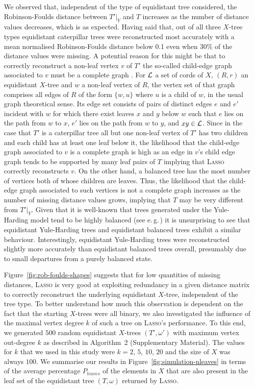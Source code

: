 We observed that, independent of the type of equidistant tree considered, the
Robinson-Foulds distance between $T'|_Y$ and $T$ increases as the number of
distance values decreases, which is as expected. Having said that, out of all
three $X$-tree types equidistant caterpillar trees were reconstructed most
accurately with a mean normalised Robinson-Foulds distance below 0.1 even when
$30\%$ of the distance values were missing. A potential reason for this might
be that to correctly reconstruct a non-leaf vertex $v$ of $T'$ the so-called
child-edge graph associated to $v$ must be a complete graph
\cite{huber13lassoing}.  For ${\mathcal L}$ a set of cords of $X$, $(R,r)$ an
equidistant $X$-tree and $w$ a non-leaf vertex of $R$, the vertex set of that
graph comprises all edges of $R$ of the form $\{w,u\}$ where $u$ is a child of
$w$, in the usual graph theoretical sense.  Its edge set consists of pairs of
distinct edges $e$ and $e'$ incident with $w$ for which there exist leaves $x$
and $y$ below $w$ such that $e$ lies on the path from $w$ to $x$, $e'$ lies on
the path from $w$ to $y$, and $xy\in {\mathcal L}$. Since in the case that $T'$ is a
caterpillar tree all but one non-leaf vertex of $T'$ has two children and each
child has at least one leaf below it, the likelihood that the child-edge graph
associated to $v$ is a complete graph is high as an edge in $v$'s child edge
graph tends to be supported by many leaf pairs of $T$ implying that
\textsc{Lasso} correctly reconstructs $v$. On the other hand, a balanced tree
has the most number of vertices both of whose children are leaves. Thus, the
likelihood that the child-edge graph associated to such vertices is not a
complete graph increases as the number of missing distance values grows,
implying that $T$ may be very different from $T'|_Y$. Given that it is
well-known that trees generated under the Yule-Harding model tend to be highly
balanced (see e.\,g.\,\cite[Section 2.5]{semple2003phylogenetics}) it is
unsurprising to see that equidistant Yule-Harding trees and equidistant
balanced trees exhibit a similar behaviour.  Interestingly, equidistant
Yule-Harding trees were reconstructed slightly more accurately than
equidistant balanced trees overall, presumably due to small departures from a
purely balanced state.

Figure~\ref{fig:rob-foulds-shapes} suggests that for low quantities of missing
distances, \textsc{Lasso} is very good at exploiting redundancy in a given
distance matrix to correctly reconstruct the underlying equidistant $X$-tree,
independent of the tree type. To better understand how much this observation
is dependent on the fact that the starting $X$-trees were all binary, we also
investigated the influence of the maximal vertex degree $k$ of such a tree on
\textsc{Lasso}'s performance. To this end, we generated $500$ random
equidistant $X$-trees $(T',\omega')$ with maximum vertex out-degree $k$ as
described in Algorithm~2 (Supplementary Material).  The values for $k$ that we
used in this study were $k=2$, $5$, $10$, $20$ and the size of $X$ was always
$100$. We summarise our results in Figure~\ref{fig:simulation-nleaves} in
terms of the average percentage $P_{leaves}$ of the elements in $X$ that are
also present in the leaf set of the equidistant tree $(T,\omega)$ returned by
\textsc{Lasso}.

